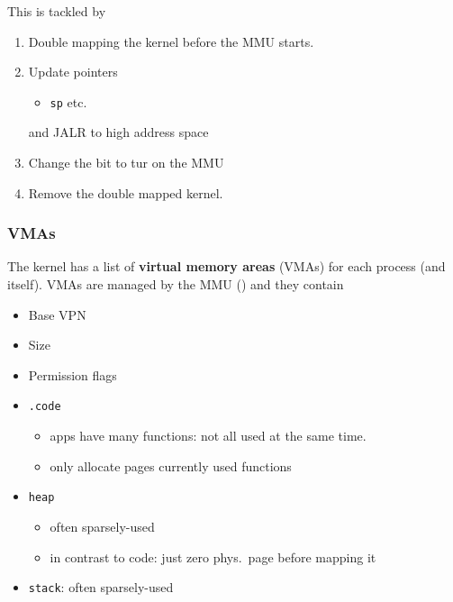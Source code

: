This is tackled by
\begin{enumerate}
    \item Double mapping the kernel before the MMU starts.
    \item Update pointers
          \begin{itemize}
              \item \texttt{sp} etc. %
          \end{itemize}
          and JALR to high address space
    \item Change the  bit to tur on the MMU
    \item Remove the double mapped kernel.
\end{enumerate}

\subsubsection{VMAs}

The kernel has a list of \textbf{virtual memory areas} (VMAs) for each process (and itself). VMAs are managed by the MMU () and they contain
\begin{itemize}
    \item Base VPN
    \item Size
    \item Permission flags
\end{itemize}

\newpar{}
\begin{itemize}
    \item \texttt{.code}
          \begin{itemize}
              \item apps have many functions: not all used at the same time.
              \item only allocate pages currently used functions
          \end{itemize}
    \item \texttt{heap}
          \begin{itemize}
              \item often sparsely-used
              \item in contrast to code: just zero phys.\ page before mapping it
          \end{itemize}
    \item \texttt{stack}: often sparsely-used
\end{itemize}

